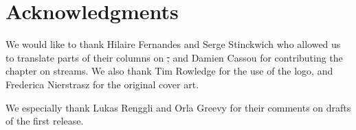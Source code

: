 \documentclass[a4paper,10pt,twoside]{book}
\begin{document}







\section*{Acknowledgments}

We would like to thank Hilaire Fernandes and Serge Stinckwich who allowed us to translate parts of their columns on \st, and Damien Cassou for contributing the chapter on streams.
We also thank Tim Rowledge for the use of the \squeak logo, and Frederica Nierstrasz for the original cover art.

We especially thank Lukas Renggli and Orla Greevy for their comments on drafts of the first release.
\end{document}
